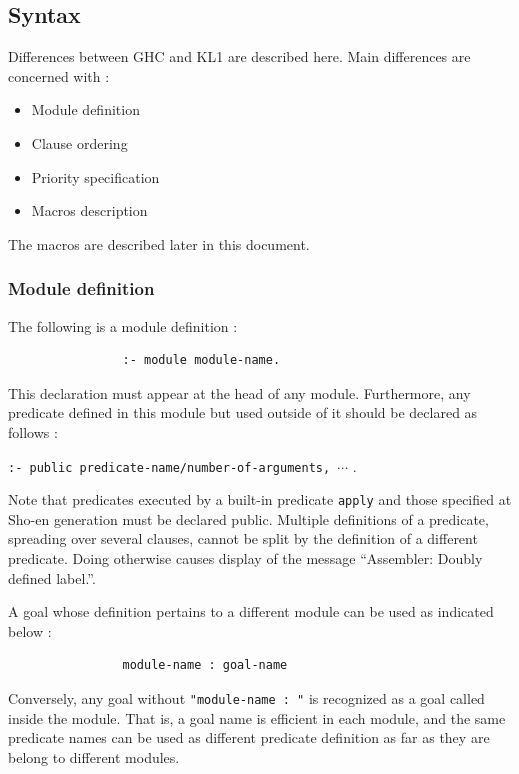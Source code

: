 \subsection{Syntax}
\label{sec-syntax}

Differences between GHC and KL1 are described here. Main differences are
concerned with :
\begin{itemize}
\item Module definition
\item Clause ordering
\item Priority specification
\item Macros description
\end{itemize}
The macros are described later in this document.

\subsubsection{Module definition}

The following is a module definition :
\begin{verbatim}
                :- module module-name.
\end{verbatim}
This declaration must appear at the head of any module.
Furthermore, any predicate defined in this module but used outside
of it should be declared as follows :
\vspace{1ex}

\hspace{19ex}\verb|:- public predicate-name/number-of-arguments, |$\cdots$ .

Note that predicates executed by a built-in predicate \verb|apply|
and those specified at Sho-en generation must be declared public.
Multiple definitions of a predicate, spreading over several clauses, cannot
be split by the definition of a different predicate.
Doing otherwise causes display of the message ``Assembler: Doubly
defined label.''.

A goal whose definition pertains to a different module can be used
as indicated below :
\begin{verbatim}
                module-name : goal-name
\end{verbatim}

Conversely, any goal without \verb|"module-name : "| is 
recognized as a goal called inside the module.
That is, a goal name is efficient in each module, and 
the same predicate names can be used as different predicate definition 
as far as they are belong to different modules.

